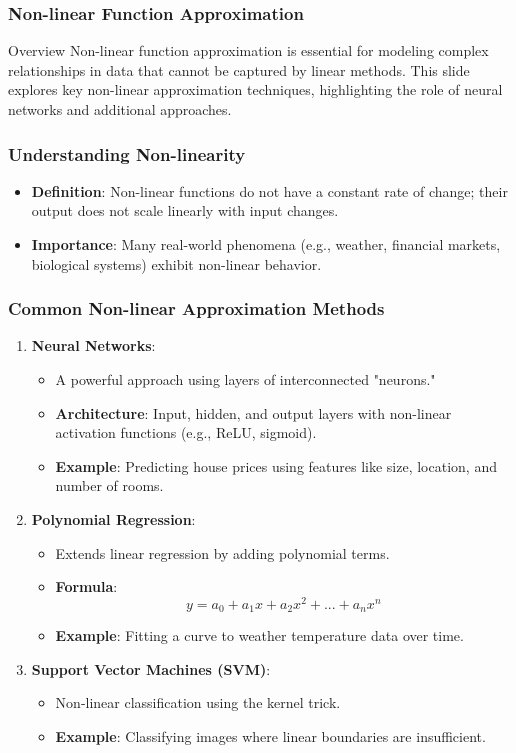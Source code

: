 \documentclass[aspectratio=169]{beamer}
\begin{document}
\begin{frame}[fragile]
  \frametitle{Non-linear Function Approximation}
  \begin{block}{Overview}
    Non-linear function approximation is essential for modeling complex relationships in data that cannot be captured by linear methods. This slide explores key non-linear approximation techniques, highlighting the role of neural networks and additional approaches.
  \end{block}
\end{frame}

\begin{frame}[fragile]
  \frametitle{Understanding Non-linearity}
  \begin{itemize}
    \item \textbf{Definition}: Non-linear functions do not have a constant rate of change; their output does not scale linearly with input changes.
    \item \textbf{Importance}: Many real-world phenomena (e.g., weather, financial markets, biological systems) exhibit non-linear behavior.
  \end{itemize}
\end{frame}

\begin{frame}[fragile]
  \frametitle{Common Non-linear Approximation Methods}
  \begin{enumerate}
    \item \textbf{Neural Networks}:
      \begin{itemize}
        \item A powerful approach using layers of interconnected "neurons."
        \item \textbf{Architecture}: Input, hidden, and output layers with non-linear activation functions (e.g., ReLU, sigmoid).
        \item \textbf{Example}: Predicting house prices using features like size, location, and number of rooms. 
      \end{itemize}

    \item \textbf{Polynomial Regression}:
      \begin{itemize}
        \item Extends linear regression by adding polynomial terms.
        \item \textbf{Formula}: 
        \[
        y = a_0 + a_1x + a_2x^2 + ... + a_nx^n
        \]
        \item \textbf{Example}: Fitting a curve to weather temperature data over time.
      \end{itemize}

    \item \textbf{Support Vector Machines (SVM)}:
      \begin{itemize}
        \item Non-linear classification using the kernel trick.
        \item \textbf{Example}: Classifying images where linear boundaries are insufficient.
      \end{itemize}
  \end{enumerate}
\end{frame}
\end{document}
